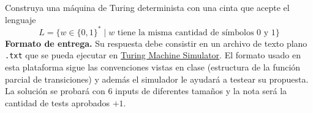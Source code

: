 Construya una máquina de Turing determinista con una cinta que acepte el lenguaje 
$$L=\{w\in \{0,1\}^*\mid w\text{ tiene la misma cantidad de símbolos }0\text{ y }1\}$$
\textbf{Formato de entrega.} Su respuesta debe consistir en un archivo de texto plano \texttt{.txt} que se pueda ejecutar en \href{https://turingmachinesimulator.com/}{Turing Machine Simulator}. El formato usado en esta plataforma sigue las convenciones vistas en clase (estructura de la función parcial de transiciones) y además el simulador le ayudará a testear su propuesta. La solución se probará con 6 inputs de diferentes tamaños y la nota será la cantidad de tests aprobados $+1$.